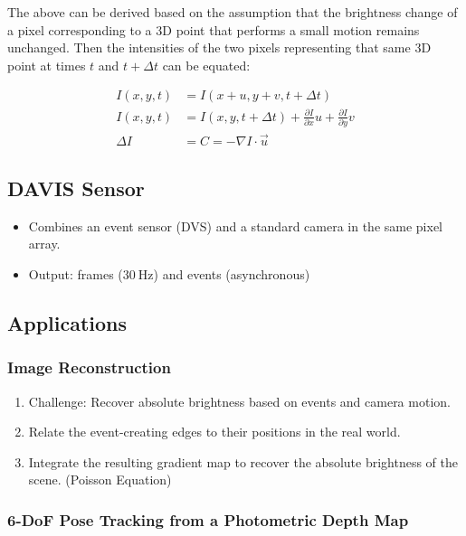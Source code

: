 \documentclass[10pt,a4paper]{scrartcl}
\begin{document}
\begin{multicols*}{2}

The above can be derived based on the assumption that the brightness change of a pixel corresponding to a 3D point that performs a small motion remains unchanged. Then the intensities of the two pixels representing that same 3D point at times $t$ and $t+\Delta t$ can be equated:

\begin{align*}
I(x,y,t) &= I(x+u,y+v,t+\Delta t)\\
I(x,y,t)&=I(x,y,t+\Delta t)+\frac{\partial I}{\partial x}u+\frac{\partial I}{\partial y}v\\
\Delta I &= C = -\nabla I\cdot\vec{u}
\end{align*}

\subsection{DAVIS Sensor}


\begin{itemize}
\item Combines an event sensor (DVS) and a standard camera in the same pixel array.
\item Output: frames ($\SI{30}{\hertz}$) and events (asynchronous)
\end{itemize}

\subsection{Applications}

\subsubsection{Image Reconstruction}

\begin{enumerate}
\item Challenge: Recover absolute brightness based on events and camera motion.
\item Relate the event-creating edges to their positions in the real world.
\item Integrate the resulting gradient map to recover the absolute brightness of the scene. (Poisson Equation)
\end{enumerate}

\subsubsection{6-DoF Pose Tracking from a Photometric Depth Map}


\end{multicols*}
\end{document}
